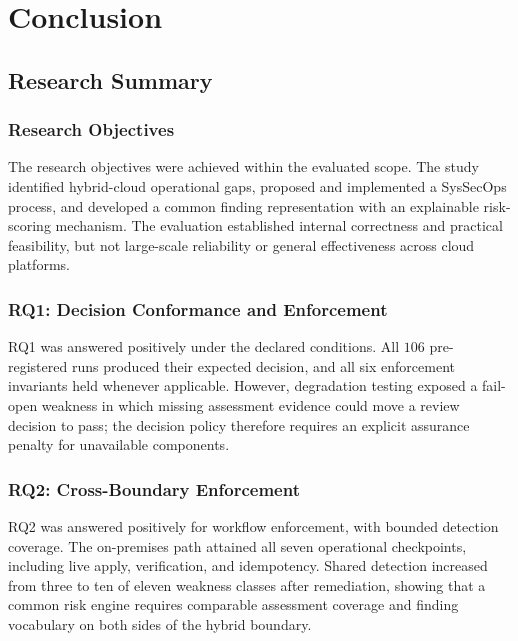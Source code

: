 \chapter{Conclusion}
\label{Chapter6}

\section{Research Summary}
\label{sec:conclusion-summary}

\subsection{Research Objectives}

The research objectives were achieved within the evaluated scope. The study identified
hybrid-cloud operational gaps, proposed and implemented a SysSecOps process, and developed
a common finding representation with an explainable risk-scoring mechanism. The
evaluation established internal correctness and practical feasibility, but not
large-scale reliability or general effectiveness across cloud platforms.

\subsection{RQ1: Decision Conformance and Enforcement}

RQ1 was answered positively under the declared conditions. All $106$ pre-registered runs
produced their expected decision, and all six enforcement invariants held whenever
applicable. However, degradation testing exposed a fail-open weakness in which missing
assessment evidence could move a review decision to pass; the decision policy therefore
requires an explicit assurance penalty for unavailable components.

\subsection{RQ2: Cross-Boundary Enforcement}

RQ2 was answered positively for workflow enforcement, with bounded detection coverage.
The on-premises path attained all seven operational checkpoints, including live apply,
verification, and idempotency. Shared detection increased from three to ten of eleven
weakness classes after remediation, showing that a common risk engine requires comparable
assessment coverage and finding vocabulary on both sides of the hybrid boundary.

